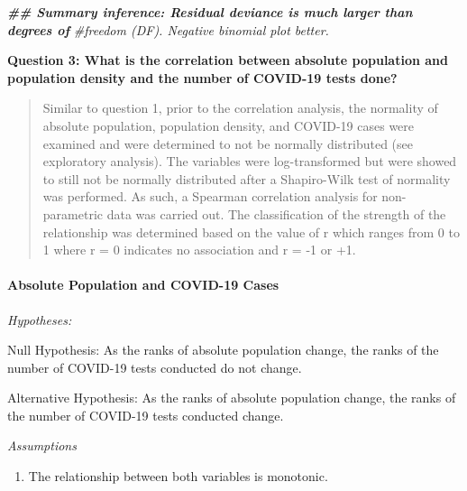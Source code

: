 \documentclass[
  12pt,
]{article}
\newenvironment{Shaded}{\begin{snugshade}}{\end{snugshade}}
\newcommand{\AttributeTok}[1]{\textcolor[rgb]{0.77,0.63,0.00}{#1}}
\newcommand{\CommentTok}[1]{\textcolor[rgb]{0.56,0.35,0.01}{\textit{#1}}}
\newcommand{\DocumentationTok}[1]{\textcolor[rgb]{0.56,0.35,0.01}{\textbf{\textit{#1}}}}
\newcommand{\FunctionTok}[1]{\textcolor[rgb]{0.00,0.00,0.00}{#1}}
\newcommand{\NormalTok}[1]{#1}
\newcommand{\OtherTok}[1]{\textcolor[rgb]{0.56,0.35,0.01}{#1}}
\newcommand{\SpecialCharTok}[1]{\textcolor[rgb]{0.00,0.00,0.00}{#1}}
\newcommand{\StringTok}[1]{\textcolor[rgb]{0.31,0.60,0.02}{#1}}
\providecommand{\tightlist}{%
  \setlength{\itemsep}{0pt}\setlength{\parskip}{0pt}}
\begin{document}
\begin{Shaded}
\begin{Highlighting}[]
\DocumentationTok{\#\# Summary inference: Residual deviance is much larger than degrees of}
\CommentTok{\#freedom (DF). Negative binomial plot better.}
\end{Highlighting}
\end{Shaded}

\textbf{Question 3: What is the correlation between absolute population
and population density and the number of COVID-19 tests done?}

\begin{quote}
Similar to question 1, prior to the correlation analysis, the normality
of absolute population, population density, and COVID-19 cases were
examined and were determined to not be normally distributed (see
exploratory analysis). The variables were log-transformed but were
showed to still not be normally distributed after a Shapiro-Wilk test of
normality was performed. As such, a Spearman correlation analysis for
non-parametric data was carried out. The classification of the strength
of the relationship was determined based on the value of r which ranges
from 0 to 1 where r = 0 indicates no association and r = -1 or +1.
\end{quote}

\hypertarget{absolute-population-and-covid-19-cases-1}{%
\paragraph{Absolute Population and COVID-19
Cases}\label{absolute-population-and-covid-19-cases-1}}

\emph{Hypotheses:}

Null Hypothesis: As the ranks of absolute population change, the ranks
of the number of COVID-19 tests conducted do not change.

Alternative Hypothesis: As the ranks of absolute population change, the
ranks of the number of COVID-19 tests conducted change.

\emph{Assumptions}

\begin{enumerate}
\def\labelenumi{\arabic{enumi}.}
\tightlist
\item
  The relationship between both variables is monotonic.
\end{enumerate}

\begin{Shaded}
\end{Shaded}
\end{document}
